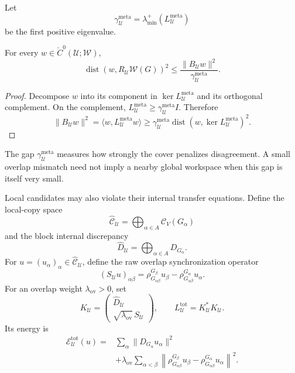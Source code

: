 Let
\[
\gamma_{\mathcal U}^{\mathrm{meta}}
=
\lambda_{\min}^+
\left(L_{\mathcal U}^{\mathrm{meta}}\right)
\]
be the first positive eigenvalue.

\begin{proposition}\label{prop:approx-overlap-gluing}
For every \(w\in\check C^0(\mathcal U;\mathscr W)\),
\[
\boxed{
\operatorname{dist}
\left(
 w,
 R_{\mathcal U}\mathscr W(G)
\right)^2
\leq
\frac{\|B_{\mathcal U}w\|^2}
{\gamma_{\mathcal U}^{\mathrm{meta}}}.
}
\]
\end{proposition}

\begin{proof}
Decompose \(w\) into its component in \(\ker L_{\mathcal U}^{\mathrm{meta}}\)
and its orthogonal complement. On the complement,
\(L_{\mathcal U}^{\mathrm{meta}}\geq
\gamma_{\mathcal U}^{\mathrm{meta}}I\). Therefore
\[
\|B_{\mathcal U}w\|^2
=
\langle w,L_{\mathcal U}^{\mathrm{meta}}w\rangle
\geq
\gamma_{\mathcal U}^{\mathrm{meta}}
\operatorname{dist}
\left(w,\ker L_{\mathcal U}^{\mathrm{meta}}\right)^2.
\]
\end{proof}

The gap \(\gamma_{\mathcal U}^{\mathrm{meta}}\) measures how strongly the cover
penalizes disagreement. A small overlap mismatch need not imply a nearby
global workspace when this gap is itself very small.


Local candidates may also violate their internal transfer equations. Define
the local-copy space
\[
\widehat{\mathcal C}_{\mathcal U}
=
\bigoplus_{\alpha\in A}\mathcal C_V(G_\alpha)
\]
and the block internal discrepancy
\[
\widehat D_{\mathcal U}
=
\bigoplus_{\alpha\in A}D_{G_\alpha}.
\]
For \(u=(u_\alpha)_\alpha\in\widehat{\mathcal C}_{\mathcal U}\), define the
raw overlap synchronization operator
\[
(S_{\mathcal U}u)_{\alpha\beta}
=
\rho_{G_{\alpha\beta}}^{G_\beta}u_\beta
-
\rho_{G_{\alpha\beta}}^{G_\alpha}u_\alpha.
\]
For an overlap weight \(\lambda_{\mathrm{ov}}>0\), set
\[
\boxed{
K_{\mathcal U}
=
\begin{pmatrix}
\widehat D_{\mathcal U}\\[0.2em]
\sqrt{\lambda_{\mathrm{ov}}}\,S_{\mathcal U}
\end{pmatrix},
\qquad
L_{\mathcal U}^{\mathrm{tot}}
=
K_{\mathcal U}^*K_{\mathcal U}.
}
\]
Its energy is
\[
\boxed{
\begin{aligned}
\mathcal E_{\mathcal U}^{\mathrm{tot}}(u)
={}&
\sum_\alpha\|D_{G_\alpha}u_\alpha\|^2\\
&+
\lambda_{\mathrm{ov}}
\sum_{\alpha<\beta}
\left\|
\rho^{G_\beta}_{G_{\alpha\beta}}u_\beta
-
\rho^{G_\alpha}_{G_{\alpha\beta}}u_\alpha
\right\|^2.
\end{aligned}
}
\]

